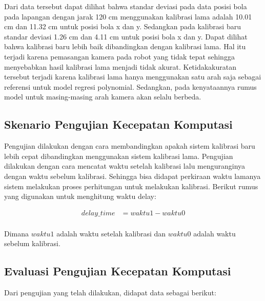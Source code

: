 Dari data tersebut dapat dilihat bahwa standar deviasi pada data posisi bola pada lapangan dengan jarak 120 cm menggunakan kalibrasi lama adalah 10.01 cm dan 11.32 cm untuk posisi bola x dan y. Sedangkan pada kalibrasi baru standar deviasi 1.26 cm dan 4.11 cm untuk posisi bola x dan y. Dapat dilihat bahwa kalibrasi baru lebih baik dibandingkan dengan kalibrasi lama. Hal itu terjadi karena pemasangan kamera pada robot yang tidak tepat sehingga menyebabkan hasil kalibrasi lama menjadi tidak akurat. Ketidakakuratan tersebut terjadi karena kalibrasi lama hanya menggunakan satu arah saja sebagai referensi untuk model regresi polynomial. Sedangkan, pada kenyataannya rumus model untuk masing-masing arah kamera akan selalu berbeda.  

\subsection{Skenario Pengujian Kecepatan Komputasi}
\label{sec:analisispengujian}

Pengujian dilakukan dengan cara membandingkan apakah sistem kalibrasi baru lebih cepat dibandingkan menggunakan sistem kalibrasi lama. Pengujian dilakukan dengan cara mencatat waktu setelah kalibrasi lalu menguranginya dengan waktu sebelum kalibrasi. Sehingga bisa didapat perkiraan waktu lamanya sistem melakukan proses perhitungan untuk melakukan kalibrasi. Berikut rumus yang digunakan untuk menghitung waktu delay: 

\begin{equation}
  \begin{aligned}
    delay\_time &= waktu1 - waktu0 \\ 
  \end{aligned}
\end{equation}

Dimana $waktu1$ adalah waktu setelah kalibrasi dan $waktu0$ adalah waktu sebelum kalibrasi.


\subsection{Evaluasi Pengujian Kecepatan Komputasi}
\label{sec:analisispengujian}

Dari pengujian yang telah dilakukan, didapat data sebagai berikut: 

